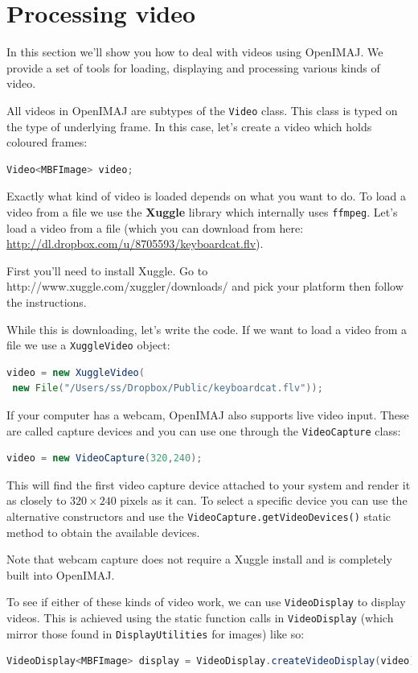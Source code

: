 \documentclass[10pt,a4paper,twoside,extrafontsizes]{memoir}
\begin{document}
\chapter{Processing video}
In this section we'll show you how to deal with videos using OpenIMAJ. We provide a 
set of tools for loading, displaying and processing various kinds of video. 

All videos in OpenIMAJ are subtypes of the \verb+Video+ class. This class is typed 
on the type of underlying frame. In this case, let's create a video which holds coloured frames:
\begin{lstlisting}[language=java]
Video<MBFImage> video;
\end{lstlisting}

Exactly what kind of video is loaded depends on what you want to do. To load a video from a file
we use the \textbf{Xuggle} library which internally uses \verb+ffmpeg+. Let's load a video 
from a file (which you can download from here: \url{http://dl.dropbox.com/u/8705593/keyboardcat.flv}).

First you'll need to install Xuggle. Go to http://www.xuggle.com/xuggler/downloads/ and pick your platform 
then follow the instructions.

While this is downloading, let's write the code. If we want to load a video from a file we use a 
\verb+XuggleVideo+ object:
\begin{lstlisting}[language=java]
video = new XuggleVideo(
 new File("/Users/ss/Dropbox/Public/keyboardcat.flv"));
\end{lstlisting}

If your computer has a webcam, OpenIMAJ also supports live video input. These are called capture 
devices and you can use one through the \verb+VideoCapture+ class:
\begin{lstlisting}[language=java]
video = new VideoCapture(320,240);
\end{lstlisting}
This will find the first video capture device attached to your system and render it as closely to 
$320\times240$ pixels as it can. To select a specific device you can use the alternative constructors
and use the \verb+VideoCapture.getVideoDevices()+ static method to obtain the available devices.

Note that webcam capture does not require a Xuggle install and is completely built into OpenIMAJ.

To see if either of these kinds of video work, we can use \verb+VideoDisplay+ to display videos. This is 
achieved using the static function calls in \verb+VideoDisplay+ (which mirror those found in 
\verb+DisplayUtilities+ for images) like so:
\begin{lstlisting}[language=java]
VideoDisplay<MBFImage> display = VideoDisplay.createVideoDisplay(video);
\end{lstlisting}
\end{document}
